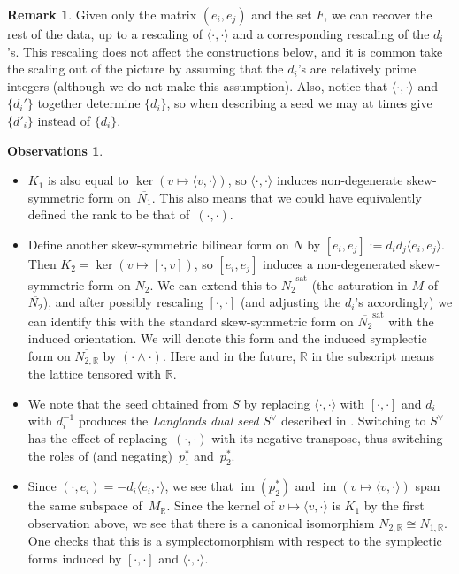 \documentclass[pdftex]{sigma}
\numberwithin{equation}{section}
\numberwithin{figure}{section}
\numberwithin{table}{section}
\DeclareMathOperator{\im}{im}
\DeclareMathOperator{\sat}{sat}
\let\?=\overline
\let\bb=\mathbb
\theoremstyle{definition}
\newtheorem{rmk}[thm]{Remark}
\newtheorem{obss}[thm]{Observations}
\begin{document}
\begin{rmk}\label{determined}Given only the matrix $(e_i,e_j)$ and the set $F$, we can recover the rest of the data, up to a rescaling of $\langle \cdot,\cdot\rangle$ and a corresponding rescaling of the $d_i$'s. This rescaling does not affect the constructions below, and it is common take the scaling out of the picture by assuming that the $d_i$'s are relatively prime integers (although we do not make this assumption). Also, notice that $\langle\cdot,\cdot\rangle$ and $\{d_i'\}$ together determine $\{d_i\}$, so when describing a seed we may at times give $\{d'_i\}$ instead of $\{d_i\}$.
\end{rmk}

\begin{obss}\label{Cluster Obs}\quad
\begin{itemize}\itemsep=0pt
\item $K_1$ is also equal to $\ker (v\mapsto \langle v,\cdot\rangle )$, so $\langle \cdot,\cdot\rangle$ induces non-degenerate skew-symmetric form on~$\?{N_1}$. This also means that we could have equivalently defined the rank to be that of~$(\cdot,\cdot)$.
\item Define another skew-symmetric bilinear form on $N$ by $[e_i,e_j]:=d_id_j\langle e_i,e_j \rangle$. Then $K_2=\ker\left(v\mapsto [ \cdot,v ] \right)$, so $[e_i,e_j]$ induces a non-degenerated skew-symmetric form on $\?{N_2}$. We can extend this to $\?{N_2}^{\sat}$ (the saturation in $M$ of $\?{N_2}$), and after possibly rescaling $[\cdot,\cdot]$ (and adjusting the $d_i$'s accordingly) we can identify this with the standard skew-symmetric form on $\?{N_2}^{\sat}$ with the induced orientation. We will denote this form and the induced symplectic form on $\?{N_{2,\bb{R}}}$ by $(\cdot\wedge \cdot)$. Here and in the future, $\bb{R}$ in the subscript means the lattice tensored with $\bb{R}$.
\item We note that the seed obtained from $S$ by replacing $\langle \cdot,\cdot\rangle$ with $[\cdot,\cdot]$ and $d_i$ with $d_i^{-1}$ produces the {\it Langlands dual seed} $S^{\vee}$ described in \cite{FG1}.
 Switching to $S^{\vee}$ has the effect of replacing~$(\cdot,\cdot)$ with its negative transpose, thus switching the roles of (and negating)~$p_1^*$ and~$p_2^*$.
\item Since $(\cdot, e_i) = -d_i\langle e_i,\cdot\rangle$, we see that $\im(p^*_2)$ and $\im(v\mapsto \langle v,\cdot\rangle)$ span the same subspace of~$M_{\bb{R}}$. Since the kernel of $v\mapsto \langle v,\cdot\rangle$ is $K_1$ by the first observation above, we see that there is a canonical isomorphism $\?{N_{2,\bb{R}}}\cong \?{N_{1,\bb{R}}}$. One checks that this is a symplectomorphism with respect to the symplectic forms induced by $[\cdot,\cdot]$ and $\langle \cdot,\cdot\rangle$.
\end{itemize}
\end{obss}
\end{document}
